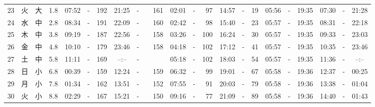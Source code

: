 \documentclass[12pt,a4j]{jsarticle}
\begin{document}
\begin{table}[htbp]
\begin{center}
{\begin{tabular}{|rc|cr|ccrccr|ccrccr|ccc|ccc|}
23 & 火 & 大 &  1.8 &  07:52 &-& 192 &  21:25 &-& 161 &  02:01 &-&  97 &  14:57 &-&  19 & 05:56 & -& 19:35 & 07:30 & -& 21:28 \\
24 & 水 & 中 &  2.8 &  08:34 &-& 191 &  22:09 &-& 160 &  02:42 &-&  98 &  15:40 &-&  23 & 05:57 & -& 19:35 & 08:31 & -& 22:18 \\
25 & 木 & 中 &  3.8 &  09:19 &-& 187 &  22:56 &-& 158 &  03:26 &-& 100 &  16:24 &-&  30 & 05:57 & -& 19:35 & 09:33 & -& 23:03 \\
26 & 金 & 中 &  4.8 &  10:10 &-& 179 &  23:46 &-& 158 &  04:18 &-& 102 &  17:12 &-&  41 & 05:57 & -& 19:35 & 10:35 & -& 23:46 \\
27 & 土 & 中 &  5.8 &  11:11 &-& 169 &  --:-- &-&~~~~~ &  05:18 &-& 102 &  18:03 &-&  54 & 05:57 & -& 19:35 & 11:36 & -& --:-- \\
28 & 日 & 小 &  6.8 &  00:39 &-& 159 &  12:24 &-& 159 &  06:32 &-&  99 &  19:01 &-&  67 & 05:58 & -& 19:36 & 12:37 & -& 00:25 \\
29 & 月 & 小 &  7.8 &  01:34 &-& 162 &  13:51 &-& 152 &  07:55 &-&  91 &  20:03 &-&  79 & 05:58 & -& 19:36 & 13:38 & -& 01:04 \\
30 & 火 & 小 &  8.8 &  02:29 &-& 167 &  15:21 &-& 150 &  09:16 &-&  77 &  21:09 &-&  89 & 05:58 & -& 19:36 & 14:40 & -& 01:43 \\
   \hline
   \end{tabular}}
   \end{center}
\end{table}
\newpage
\end{document}
